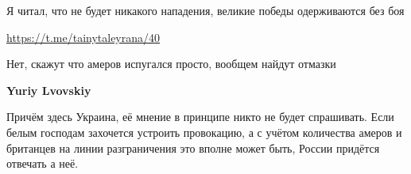 \begin{multicols}{2}

Я читал, что не будет никакого нападения, великие победы одерживаются без боя

\url{https://t.me/tainytaleyrana/40}


Нет, скажут что амеров испугался просто, вообщем найдут отмазки

\textbf{Yuriy Lvovskiy}

Причём здесь Украина, её мнение в принципе никто не будет спрашивать. Если
белым господам захочется устроить провокацию, а с учётом количества амеров и
британцев на линии разграничения это вполне может быть, России придётся
отвечать а неё.

\end{multicols} %
